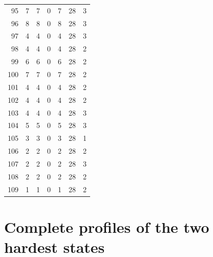 \documentclass[11pt]{article}
\begin{document}
\begin{center}
\begin{longtable}{r r r r r r r}
95 & 7 & 7 & 0 & 7 & 28 & 3\\
96 & 8 & 8 & 0 & 8 & 28 & 3\\
97 & 4 & 4 & 0 & 4 & 28 & 3\\
98 & 4 & 4 & 0 & 4 & 28 & 2\\
99 & 6 & 6 & 0 & 6 & 28 & 2\\
100 & 7 & 7 & 0 & 7 & 28 & 2\\
101 & 4 & 4 & 0 & 4 & 28 & 2\\
102 & 4 & 4 & 0 & 4 & 28 & 2\\
103 & 4 & 4 & 0 & 4 & 28 & 3\\
104 & 5 & 5 & 0 & 5 & 28 & 3\\
105 & 3 & 3 & 0 & 3 & 28 & 1\\
106 & 2 & 2 & 0 & 2 & 28 & 2\\
107 & 2 & 2 & 0 & 2 & 28 & 3\\
108 & 2 & 2 & 0 & 2 & 28 & 2\\
109 & 1 & 1 & 0 & 1 & 28 & 2\\
\bottomrule\end{longtable}
\end{center}

\section{Complete profiles of the two hardest states}
\end{document}

